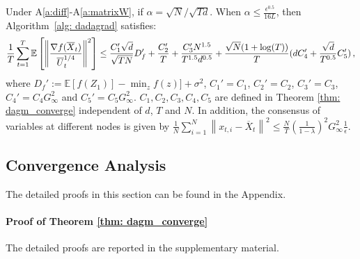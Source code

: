 \documentclass[anon,12pt]{colt2021} %
\begin{document}
\begin{boxtheo}\label{thm: dadagrad_converge}
Under A\ref{a:diff}-A\ref{a:matrixW}, if $\alpha = \sqrt{N}/\sqrt{Td}$. When $\alpha  \leq \frac{\epsilon^{0.5}}{16L} $, then Algorithm~\ref{alg: dadagrad} satisfies:
	   \begin{align}\notag
	   \frac{1}{T}\sum_{t=1}^T  \mathbb E \left [\left\|\frac{\nabla f( \overline X_{t})}{\overline U_{t}^{1/4}}\right\|^2  \right]
	  \leq     \frac{C_1' \sqrt{d}}{\sqrt{TN}} D_f'    +  \frac{ C_2'}{T} +  \frac{C_3' N^{1.5}}{T^{1.5}d^{0.5}} 
	 + \frac{\sqrt{N}(1+\log (T))}{T} ( d C_4' + \frac{\sqrt{d} }{T^{0.5} }  C_5')\, ,
	  \end{align}
	where $D_f' := \mathbb E  [f( Z_{1})]  - \min_{z} f(z)]  + \sigma^2$, $C_1' = C_1$, $C_2' = C_2$, $C_3' = C_3$, $C_4' = C_4G_{\infty}^2$ and $C_5' = C_5 G_{\infty}^2 $. $C_1,C_2, C_3, C_4, C_5$ are  defined in Theorem \ref{thm: dagm_converge} independent of $d$, $T$ and $N$. In addition, the consensus of variables at different nodes is given by $\frac{1}{N}\sum_{i=1}^N\left\| {  x_{t,i} -   \overline X_{t}}  \right\|^2   \leq \frac{N}{T} \left (\frac{1}{1-\lambda} \right)^2  G_{\infty}^2 \frac{1}{\epsilon}$. 
\end{boxtheo}



\subsection{Convergence Analysis}
The detailed proofs in this section can be found in the Appendix.

\paragraph{Proof of Theorem \ref{thm: dagm_converge}} The detailed proofs are reported in the supplementary material.
\end{document}
